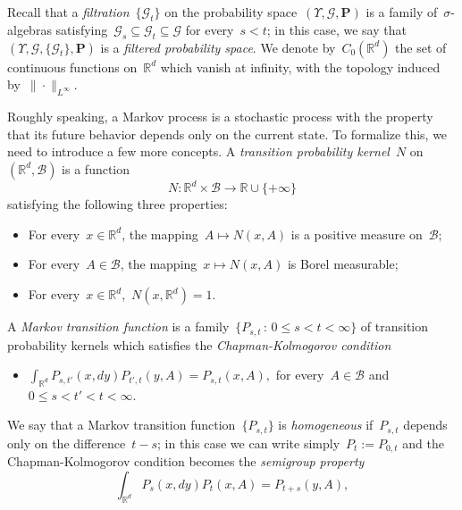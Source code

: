 \documentclass[11pt,twoside]{article} %
\numberwithin{equation}{section}
\theoremstyle{definition}
\newcommand*{\R}{\ensuremath{\mathbb{R}}}
\newcommand*{\Rd}{\ensuremath{\mathbb{R}^d}}
\begin{document}
\smallskip

Recall that a \emph{filtration}~$\{ \mathcal{G}_t \}$
on the probability space~$(\Upsilon, \mathcal{G}, \mathbf{P})$
is a family of~$\sigma$-algebras satisfying~$\mathcal{G}_s \subseteq \mathcal{G}_t \subseteq \mathcal{G}$ for every~$s<t$; in this case, we say that~$(\Upsilon, \mathcal{G}, \{ \mathcal{G}_t \},\mathbf{P})$ is a \emph{filtered probability space}. 
We denote by~$C_0(\Rd)$ the set of continuous functions on~$\Rd$ which vanish at infinity, with the topology induced by~$\| \cdot \|_{L^\infty}$. 

\smallskip

Roughly speaking, a Markov process is a stochastic process with the property that its future behavior depends only on the current state. 
To formalize this, we need to introduce a few more concepts. 
A \emph{transition probability kernel}~$N$ on~$(\Rd,\mathscr{B})$ is a function 
\begin{equation*}
N:\Rd \times \mathscr{B} \to \R \cup \{ +\infty\}
\end{equation*}
satisfying the following three properties:
\begin{itemize}
\item For every~$x	\in \Rd$, the mapping~$A \mapsto N(x,A)$ is a positive measure on~$\mathscr{B}$;

\item For every~$A \in \mathscr{B}$, the mapping~$x \mapsto N(x,A)$ is Borel measurable;

\item For every~$x	\in \Rd$,~$N(x,\Rd) =1$. 
\end{itemize}
A \emph{Markov transition function} is a family~$\{ P_{s,t}\,:\, 0 \leq s < t < \infty \}$ of transition probability kernels which satisfies the \emph{Chapman-Kolmogorov condition}
\begin{itemize} 

\item 
$\displaystyle\int_{\Rd} P_{s,t'}(x,dy) P_{t',t} (y,A) 
=
P_{s,t} (x,A),$
for every~$A \in \mathscr{B}$ and~$0\leq s < t' < t < \infty$.
\end{itemize}
We say that a Markov transition function~$\{ P_{s,t} \}$ is \emph{homogeneous} if~$P_{s,t}$ depends only on the difference~$t-s$; in this case we can write simply~$P_t:= P_{0,t}$ and the Chapman-Kolmogorov condition becomes the \emph{semigroup property}
\begin{equation*}
\int_{\Rd} P_{s}(x,dy) P_{t} (x,A) 
=
P_{t+s} (y,A),
\end{equation*}
\end{document}
